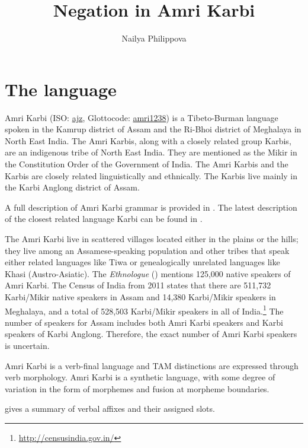 \documentclass[output=paper,colorlinks,citecolor=brown]{langscibook}
\author{Nailya Philippova\affiliation{}}
\title{Negation in Amri Karbi}
\begin{document}
\maketitle 

\section{The language}\label{sec:amr:1}

Amri Karbi (ISO: \href{https://iso639-3.sil.org/code/ajz}{ajz}, Glottocode: \href{https://glottolog.org/resource/languoid/id/amri1238}{amri1238}) is a Tibeto-Burman language spoken in the Kamrup district of Assam and the Ri-Bhoi district of Meghalaya in North East India. 
The Amri Karbis, along with a closely related group Karbis, are an indigenous tribe of North East India. They are mentioned as the Mikir in the Constitution Order of the Government of India. The Amri Karbis and the Karbis are closely related linguistically and ethnically. The Karbis live mainly in the Karbi Anglong district of Assam. 

A full description of Amri Karbi grammar is provided in \citet{Philippova2021}. The latest description of the closest related language Karbi can be found in \citet{Konnerth2014}.

The Amri Karbi live in scattered villages located either in the plains or the hills; they live among an Assamese-speaking population and other tribes that speak either related languages like Tiwa or genealogically unrelated languages like Khasi (Austro-Asiatic). The \textit{Ethnologue} (\citealt{EberhardEtAl2019}) mentions 125,000 native speakers of Amri Karbi. The Census of India from 2011 states that there are 511,732 Karbi/Mikir native speakers in Assam and 14,380 Karbi/Mikir speakers in Meghalaya, and a total of 528,503 Karbi/Mikir speakers in all of India.\footnote{\href{http://censusindia.gov.in/}{http://censusindia.gov.in/}} The number of speakers for Assam includes both Amri Karbi speakers and Karbi speakers of Karbi Anglong. Therefore, the exact number of Amri Karbi speakers is uncertain.

Amri Karbi is a verb-final language and TAM distinctions are expressed through verb morphology. Amri Karbi is a synthetic language, with some degree of variation in the form of morphemes and fusion at morpheme boundaries.

 gives a summary of verbal affixes and their assigned slots. 
\end{document}
